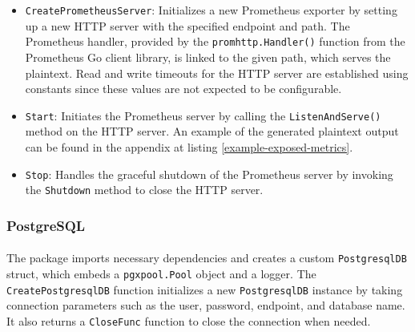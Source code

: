 \documentclass[12pt, conference, final, a4paper, onecolumn, compsoc]{IEEEtran}
\begin{document}
\begin{itemize}
  \item \texttt{CreatePrometheusServer}: Initializes a new Prometheus exporter
        by setting up a new HTTP server with the specified endpoint and path.
        The Prometheus handler, provided by the \texttt{promhttp.Handler()}
        function from the Prometheus Go client library, is linked to the given
        path, which serves the plaintext. Read and write timeouts for the HTTP
        server are established using constants since these values are not
        expected to be configurable.
  \item \texttt{Start}: Initiates the Prometheus server by calling the
        \texttt{ListenAndServe()} method on the HTTP server. An example of the
        generated plaintext output can be found in the appendix at listing
        \ref{example-exposed-metrics}.
  \item \texttt{Stop}: Handles the graceful shutdown of the Prometheus server by
        invoking the \texttt{Shutdown} method to close the HTTP server.
\end{itemize}

\subsubsection*{PostgreSQL}
\paragraph{}

The package imports necessary dependencies and creates a custom
\texttt{PostgresqlDB} struct, which embeds a \texttt{pgxpool.Pool} object and a
logger. The \texttt{CreatePostgresqlDB} function initializes a new
\texttt{PostgresqlDB} instance by taking connection parameters such as the user,
password, endpoint, and database name. It also returns a \texttt{CloseFunc}
function to close the connection when needed.
\end{document}

